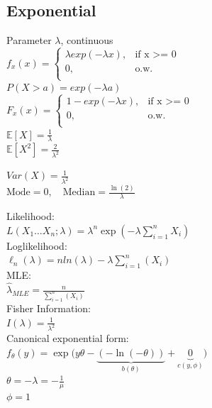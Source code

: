 \subsection*{Exponential}
Parameter $\lambda$, continuous\\
$ f_x(x)=
	\begin{cases}
		 \lambda exp(-\lambda x),&\text{if x >= 0}\\
		0,&\text{o.w.}\\
	\end{cases}
$\\

$P(X>a)= exp(-\lambda a)$\\

$ F_x(x)=
	\begin{cases}
		 1-exp(-\lambda x),&\text{if x >= 0}\\
		0,&\text{o.w.}\\
	\end{cases}
$\\

$\mathbb{E}[X]=\frac{1}{\lambda}$\\

$\mathbb{E}[X^2]=\frac{2}{\lambda^2}$

$Var(X)=\frac{1}{\lambda^2}$\\
$\text{Mode} = 0,\quad \text{Median} = \frac{\ln(2)}{\lambda}$


Likelihood:\\
$L(X_1\dots X_n;\lambda)=\lambda^n\exp\left(-\lambda\sum_{i=1}^n X_i\right)$\\

Loglikelihood:\\

$\ell_n (\lambda)= n ln(\lambda) - \lambda \sum_{i=1}^n (X_i)$\\

MLE:\\

$\hat{\lambda}_{MLE}= \frac{n}{\sum^{n}_{i=1}(X_i)}$\\

Fisher Information:\\

$I(\lambda)= \frac{1}{\lambda^2}$\\

Canonical exponential form:\\

$f_{\theta}(y) = \exp\big(y\theta - \underbrace{(-\ln(-\theta))}_{b(\theta)} + \underbrace{0}_{c(y, \phi)}\big)$\\
$\theta = -\lambda = -\frac1{\mu}$\\
$\phi = 1$

